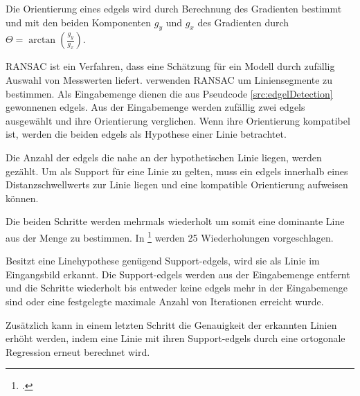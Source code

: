 Die Orientierung eines \gls{edgels} wird durch Berechnung des Gradienten bestimmt und mit den beiden Komponenten $g_y$ und $g_x$ des Gradienten durch $\Theta = \arctan{\left(\frac{g_y}{g_x}\right)}$.

\begin{comment}
	Auf einem engem Samplingraster wird das Eingangsbild mit einem derivative of Gaussian gefaltet und der intensity gradient bestimmt. Ist das lokale maxium des intensity gradient höher als ein festgelegter Schwellwert wird das Pixel als Edgel erkannt und die Orientierung berechnet.
\end{comment}



RANSAC ist ein Verfahren, dass eine Schätzung für ein Modell durch zufällig Auswahl von Messwerten liefert. \citeauthor{clarke96} verwenden RANSAC um Liniensegmente zu bestimmen. Als Eingabemenge dienen die aus Pseudcode \ref{src:edgelDetection} gewonnenen \gls{edgels}. Aus der Eingabemenge werden zufällig zwei \gls{edgels} ausgewählt und ihre Orientierung verglichen. Wenn ihre Orientierung kompatibel ist, werden die beiden \gls{edgels} als Hypothese einer Linie betrachtet.

Die Anzahl der \gls{edgels} die nahe an der hypothetischen Linie liegen, werden gezählt. Um als Support für eine Linie zu gelten, muss ein \gls{edgels} innerhalb eines Distanzschwellwerts zur Linie liegen und eine kompatible Orientierung aufweisen können.

Die beiden Schritte werden mehrmals wiederholt um somit eine dominante Line aus der Menge zu bestimmen. In \citeauthor{clarke96}\footcite[Vgl.][S.~417]{clarke96} werden 25 Wiederholungen vorgeschlagen.

Besitzt eine Linehypothese genügend Support-\gls{edgels}, wird sie als Linie im Eingangsbild erkannt. Die Support-\gls{edgels} werden aus der Eingabemenge entfernt und die Schritte wiederholt bis entweder keine \gls{edgels} mehr in der Eingabemenge sind oder eine festgelegte maximale Anzahl von Iterationen erreicht wurde.

Zusätzlich kann in einem letzten Schritt die Genauigkeit der erkannten Linien erhöht werden, indem eine Linie mit ihren Support-\gls{edgels} durch eine ortogonale Regression erneut berechnet wird.

